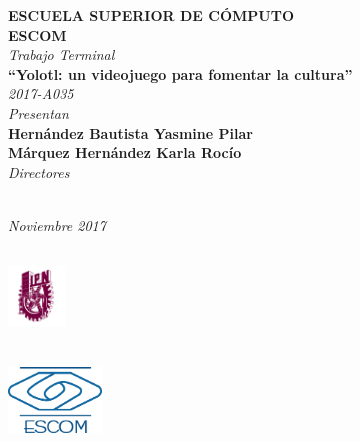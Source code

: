 \begin{titlepage}
{\begin{center}
	    {\fontsize{16}{20} \textbf{ESCUELA SUPERIOR DE CÓMPUTO}}\vspace{1cm}\\[1cm]
	    {\fontsize{20}{20} \textbf{ESCOM}}\vspace{2cm}\\
	    
	    {\fontsize{14}{20} \textit{Trabajo Terminal}}\vspace{1cm}\\
	    {\fontsize{16}{20} \textbf{``Yolotl: un videojuego para fomentar la cultura''}}\vspace{0.5cm}\\
	    {\fontsize{14}{20} \textit{2017-A035}}\vspace{1.5cm}\\
	    {\fontsize{14}{20} \textit{Presentan}}\\
	    {\fontsize{14}{20} \textbf{Hernández Bautista Yasmine Pilar}}\vspace{1cm}\\
	   	{\fontsize{14}{20} \textbf{Márquez Hernández Karla Rocío}}\vspace{1.5cm}\\
	   \fontsize{14}{20} \textit{Directores}\\

	    
	    
{\fboxrule=0pt \fboxsep=6pt	    
}\\[3.5cm]
\end{center}
	    
	    \hfill  \fontsize{12}{20} \textit{Noviembre 2017}
	    
	}
\end{titlepage}

\thispagestyle{empty}

\parbox{18cm}{
\parbox{1.5cm}{
\includegraphics[width=1.5cm,height=2.5cm]{imagen/IPN.png}
}
\parbox{12cm}{
}
\parbox{1.5cm}{
\includegraphics[width=2.5cm,height=2cm]{imagen/logoescom.png}
}\vspace{1.5cm} 
}

